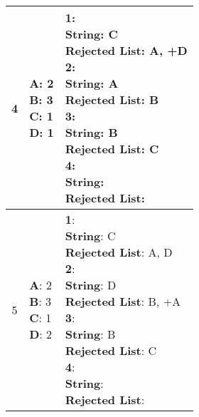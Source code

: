 \documentclass{article}
\begin{document}
\begin{center}
\begin{longtable}{ c|l|l }
        4 & \makecell{\textbf{A}: 2 \\ \textbf{B}: 3 \\ \textbf{C}: 1 \\ \textbf{D}: 1} &  
        \makecell{\textbf{1}:\\ \hspace{10mm} \textbf{String}: C \\ \hspace{10mm} \textbf{Rejected List}: A, +D \\
                    \textbf{2}:\\ \hspace{10mm} \textbf{String}: A \\ \hspace{10mm} \textbf{Rejected List}: B \\
                    \textbf{3}:\\ \hspace{10mm} \textbf{String}: B \\ \hspace{10mm} \textbf{Rejected List}: C\\
                    \textbf{4}:\\ \hspace{10mm} \textbf{String}:  \\ \hspace{10mm} \textbf{Rejected List}: \\} \\
        \hline 

        5 & \makecell{\textbf{A}: 2 \\ \textbf{B}: 3 \\ \textbf{C}: 1 \\ \textbf{D}: 2} &  
        \makecell{\textbf{1}:\\ \hspace{10mm} \textbf{String}: C \\ \hspace{10mm} \textbf{Rejected List}: A, D \\
                    \textbf{2}:\\ \hspace{10mm} \textbf{String}: D \\ \hspace{10mm} \textbf{Rejected List}: B, +A \\
                    \textbf{3}:\\ \hspace{10mm} \textbf{String}: B \\ \hspace{10mm} \textbf{Rejected List}: C\\
                    \textbf{4}:\\ \hspace{10mm} \textbf{String}:  \\ \hspace{10mm} \textbf{Rejected List}: \\} \\
        \hline 


\end{longtable}
\end{center}
\end{document}
